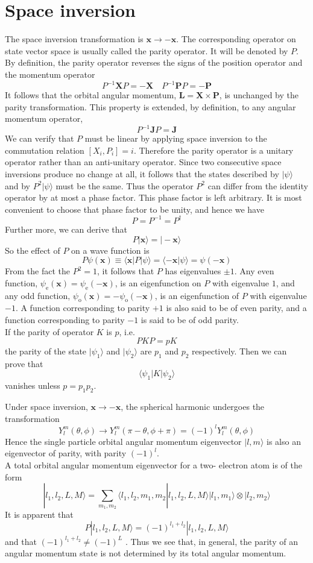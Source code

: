 \section{Space inversion}
The space inversion transformation is $\bm{x} \to -\bm{x}$. The corresponding operator on state vector space is usually called the parity operator. It will be denoted by $P$. By definition, the parity operator reverses the signs of the position operator and the momentum operator
\[P^{-1}\bm{X}P = -\bm{X} \quad P^{-1}\bm{P}P = -\bm{P}\]
It follows that the orbital angular momentum, $\bm{L} = \bm{X}\times\bm{P}$, is unchanged by the parity transformation. This property is extended, by definition, to any angular momentum operator,
\[P^{-1}\bm{J}P = \bm{J}\]
We can verify that $P$ must be linear by applying space inversion to the commutation relation $[X_i,P_i] = i$. Therefore the parity operator is a unitary operator rather than an anti-unitary operator. Since two consecutive space inversions produce no change at all, it follows that the states described by $|\psi\rangle$ and by $P^2|\psi\rangle$ must be the same. Thus the
operator $P^2$ can differ from the identity operator by at most a phase factor. This phase factor is left arbitrary. It is most convenient to choose that phase factor to be unity, and hence we have
\[P = P^{-1} = P^{\dagger}\]
Further more, we can derive that
\[P|\bm{x}\rangle = |-\bm{x}\rangle\]
So the effect of $P$ on a wave function is
\[P\psi(\bm{x}) \equiv \langle \bm{x} | P | \psi\rangle = \langle -\bm{x} | \psi\rangle = \psi(-\bm{x})\]
From the fact the $P^2=1$, it follows that $P$ has eigenvalues $\pm 1$. Any even function, $\psi_{\mathrm{e}}(\bm{x}) = \psi_{\mathrm{e}}(-\bm{x})$, is an eigenfunction on $P$ with eigenvalue $1$, and any odd function, $\psi_{\mathrm{o}}(\bm{x}) = -\psi_{\mathrm{o}}(-\bm{x})$, is an eigenfunction of $P$ with eigenvalue $-1$.
A function corresponding to parity $+1$ is also said to be of even parity, and a function corresponding to parity $-1$ is said to be of odd parity.
\\
If the parity of operator $K$ is $p$, i.e. 
\[PKP = pK\] 
the parity of the state $|\psi_1\rangle$ and $|\psi_2\rangle$ are $p_1$ and $p_2$ respectively. Then we can prove that 
\[\langle \psi_1 | K | \psi_2 \rangle\]
vanishes unless $p = p_1 p_2$.

\begin{example}
Under space inversion, $\bm{x} \to -\bm{x}$, the spherical harmonic undergoes the transformation
\[Y_l^m(\theta,\phi) \to Y_l^m(\pi-\theta,\phi+\pi) = (-1)^l Y_l^m(\theta,\phi)\]
Hence the single particle orbital angular momentum eigenvector $|l,m\rangle$ is also an eigenvector of parity, with parity $(-1)^l$.
\\
A total orbital angular momentum eigenvector for a two-
electron atom is of the form
\[|l_1,l_2,L,M\rangle = \sum_{m_1,m_2}  \langle l_1,l_2,m_1,m_2 | l_1,l_2,L,M\rangle |l_1,m_1\rangle \otimes |l_2,m_2\rangle\]
It is apparent that
\[P|l_1,l_2,L,M\rangle = (-1)^{l_1+l_2}|l_1,l_2,L,M\rangle\]
and that $(-1)^{l_1+l_2} \neq (-1)^{L}$ . Thus we see that, in general, the parity of an angular momentum state is not determined by its total angular momentum.
\end{example}

